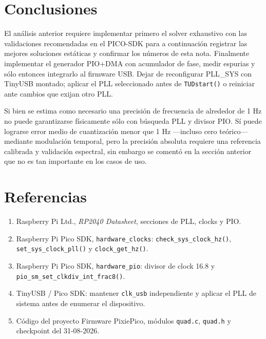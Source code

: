 \documentclass[10pt,a4paper]{article}
\begin{document}
\section*{Conclusiones}
\begin{technicalbox}
El análisis anterior requiere implementar primero el solver exhaustivo con las
validaciones recomendadas en el PICO-SDK para a continuación
registrar las mejores soluciones estáticas y confirmar los números de esta
nota. 
Finalmente implementar el generador PIO+DMA con acumulador de fase, medir
espurias y sólo entonces integrarlo al firmware USB. Dejar de reconfigurar
PLL\_SYS con TinyUSB montado; aplicar el PLL seleccionado antes de
\texttt{TUDstart()} o reiniciar ante cambios que exijan otro PLL.
\end{technicalbox}

Si bien se estima como necesario una precisión de frecuencia de alrededor de
1 Hz no puede garantizarse físicamente sólo
con búsqueda PLL y divisor PIO. Sí puede lograrse error medio de cuantización
menor que 1 Hz ---incluso cero teórico--- mediante modulación temporal, pero
la precisión absoluta requiere una referencia calibrada y validación
espectral, sin embargo se comentó en la sección anterior que no es tan 
importante en los casos de uso.

\section*{Referencias}
\begin{enumerate}
\item Raspberry Pi Ltd., \emph{RP2040 Datasheet}, secciones de PLL, clocks y PIO.
\item Raspberry Pi Pico SDK, \texttt{hardware\_clocks}:
\texttt{check\_sys\_clock\_hz()}, \texttt{set\_sys\_clock\_pll()} y
\texttt{clock\_get\_hz()}.
\item Raspberry Pi Pico SDK, \texttt{hardware\_pio}: divisor de clock 16.8 y
\texttt{pio\_sm\_set\_clkdiv\_int\_frac8()}.
\item TinyUSB / Pico SDK: mantener \texttt{clk\_usb} independiente y aplicar
el PLL de sistema antes de enumerar el dispositivo.
\item Código del proyecto Firmware PixiePico, módulos \texttt{quad.c},
\texttt{quad.h} y checkpoint del 31-08-2026.
\end{enumerate}
\end{document}
